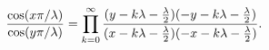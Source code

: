 \begin{equation}
\frac{\cos (x\pi /\lambda )}{\cos (y\pi /\lambda )}=\prod\limits_{k=0}^{%
\infty }\frac{(y-k\lambda -\frac{\lambda }{2})(-y-k\lambda -\frac{\lambda }{2%
})}{(x-k\lambda -\frac{\lambda }{2})(-x-k\lambda -\frac{\lambda }{2})}.
\end{equation}

